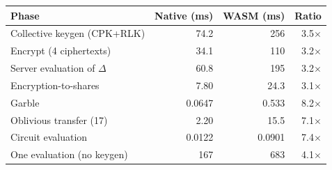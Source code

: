 \begin{tabular}{lrrr}
\hline
Phase & Native (ms) & WASM (ms) & Ratio \\
\hline
Collective keygen (CPK+RLK) & 74.2 & 256 & 3.5$\times$ \\
Encrypt (4 ciphertexts) & 34.1 & 110 & 3.2$\times$ \\
Server evaluation of $\Delta$ & 60.8 & 195 & 3.2$\times$ \\
Encryption-to-shares & 7.80 & 24.3 & 3.1$\times$ \\
Garble & 0.0647 & 0.533 & 8.2$\times$ \\
Oblivious transfer (17) & 2.20 & 15.5 & 7.1$\times$ \\
Circuit evaluation & 0.0122 & 0.0901 & 7.4$\times$ \\
One evaluation (no keygen) & 167 & 683 & 4.1$\times$ \\
\hline
\end{tabular}

